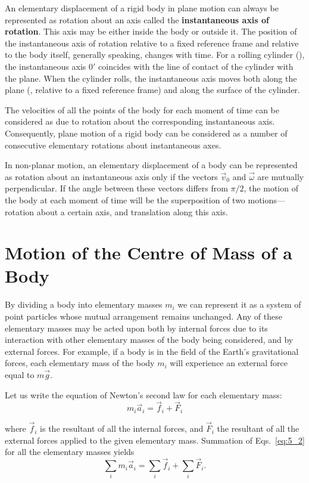 An elementary displacement of a rigid body in plane motion can always be represented as rotation about an axis called the \textbf{instantaneous axis of rotation}. This axis may be either inside the body or outside it. The position of the instantaneous axis of rotation relative to a fixed reference frame and relative to the body itself, generally speaking, changes with time. For a rolling cylinder (), the instantaneous axis $0'$ coincides with the line of contact of the cylinder with the plane. When the cylinder rolls, the instantaneous axis moves both along the plane (\ie, relative to a fixed reference frame) and along the surface of the cylinder.

The velocities of all the points of the body for each moment of time can be considered as due to rotation about the corresponding instantaneous axis. Consequently, plane motion of a rigid body can be considered as a number of consecutive elementary rotations about instantaneous axes.

In non-planar motion, an elementary displacement of a body can be represented as rotation about an instantaneous axis only if the vectors $\vec{v}_0$ and $\vec{\omega}$ are mutually perpendicular. If the angle between these vectors differs from $\pi/2$, the motion of the body at each moment of time will be the superposition of two motions---rotation about a certain axis, and translation along this axis.

\section{Motion of the Centre of Mass of a Body}\label{sec:5_2}

By dividing a body into elementary masses $m_i$ we can represent it as a system of point particles whose mutual arrangement remains unchanged. Any of these elementary masses may be acted upon both by internal forces due to its interaction with other elementary masses of the body being considered, and by external forces. For example, if a body is in the field of the Earth's gravitational forces, each elementary mass of the body $m_i$ will experience an external force equal to $m\vec{g}$.

Let us write the equation of Newton's second law for each elementary mass:
\begin{equation}\label{eq:5_2}
m_i\vec{a}_i = \vec{f}_i + \vec{F}_i
\end{equation}

\noindent
where $\vec{f}_i$ is the resultant of all the internal forces, and $\vec{F}_i$ the resultant of all the external forces applied to the given elementary mass. Summation of Eqs.~\eqref{eq:5_2} for all the elementary masses yields
\begin{equation}\label{eq:5_3}
	\sum_i m_i\vec{a}_i = \sum_i \vec{f}_i + \sum_i \vec{F}_i.
\end{equation}

